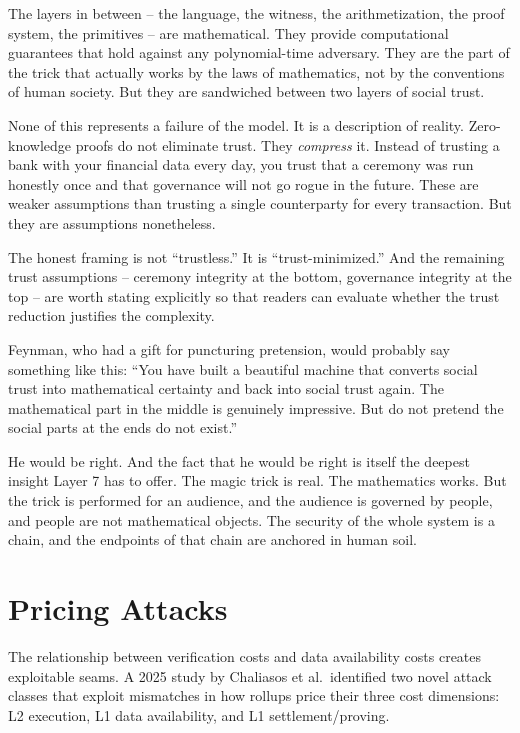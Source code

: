\documentclass[
  11pt,
  openany]{report}
\begin{document}
The layers in between -- the language, the witness, the arithmetization, the
proof system, the primitives -- are mathematical. They provide computational
guarantees that hold against any polynomial-time adversary. They are the part of
the trick that actually works by the laws of mathematics, not by the conventions
of human society. But they are sandwiched between two layers of social trust.

None of this represents a failure of the model. It is a description of reality.
Zero-knowledge proofs do not eliminate trust. They \emph{compress} it. Instead
of trusting a bank with your financial data every day, you trust that a ceremony
was run honestly once and that governance will not go rogue in the future. These
are weaker assumptions than trusting a single counterparty for every
transaction. But they are assumptions nonetheless.

The honest framing is not ``trustless.'' It is ``trust-minimized.'' And the
remaining trust assumptions -- ceremony integrity at the bottom, governance
integrity at the top -- are worth stating explicitly so that readers can
evaluate whether the trust reduction justifies the complexity.

Feynman, who had a gift for puncturing pretension, would probably say something
like this: ``You have built a beautiful machine that converts social trust into
mathematical certainty and back into social trust again. The mathematical part
in the middle is genuinely impressive. But do not pretend the social parts at
the ends do not exist.''

He would be right. And the fact that he would be right is itself the deepest
insight Layer 7 has to offer. The magic trick is real. The mathematics works.
But the trick is performed for an audience, and the audience is governed by
people, and people are not mathematical objects. The security of the whole
system is a chain, and the endpoints of that chain are anchored in human soil.

\section{Pricing Attacks}\label{pricing-attacks}

The relationship between verification costs and data availability costs creates
exploitable seams. A 2025 study by Chaliasos et al.~identified two novel attack
classes that exploit mismatches in how rollups price their three cost
dimensions: L2 execution, L1 data availability, and L1 settlement/proving.
\end{document}
